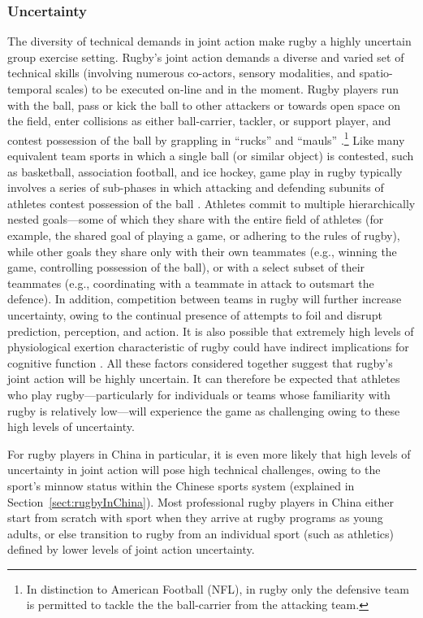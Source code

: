 \begin{CJK}{UTF8}{gbsn}
\subsubsection{Uncertainty}
The diversity of technical demands in joint action make rugby a highly uncertain group exercise setting.  Rugby's joint action demands a diverse and varied set of technical skills (involving numerous co-actors, sensory modalities, and spatio-temporal scales) to be executed on-line and in the moment.  Rugby players run with the ball, pass or kick the ball to other attackers or towards open space on the field, enter collisions as either ball-carrier, tackler, or support player, and contest possession of the ball by grappling in ``rucks'' and ``mauls'' \citep{Ross2015a}.\footnote{In distinction to American Football (NFL), in rugby only the defensive team is permitted to tackle the the ball-carrier from the attacking team.}  Like many equivalent team sports in which a single ball (or similar object) is contested, such as basketball, association football, and ice hockey, game play in rugby typically involves a series of sub-phases in which attacking and defending subunits of athletes contest possession of the ball \citep{Passos2011}.  Athletes commit to multiple hierarchically nested goals---some of which they share with the entire field of athletes (for example, the shared goal of playing a game, or adhering to the rules of rugby), while other goals they share only with their own teammates (e.g., winning the game, controlling possession of the ball), or with a select subset of their teammates (e.g., coordinating with a teammate in attack to outsmart the defence).  In addition, competition between teams in rugby will further increase uncertainty, owing to the continual presence of attempts to foil and disrupt prediction, perception, and action. It is also possible that extremely high levels of physiological exertion characteristic of rugby could have indirect implications for cognitive function \citep{Dietrich2004a}.
All these factors considered together suggest that rugby's joint action will be highly uncertain. It can therefore be expected that athletes who play rugby---particularly for individuals or teams whose familiarity with rugby is relatively low---will experience the game as challenging owing to these high levels of uncertainty. 

For rugby players in China in particular, it is even more likely that high levels of uncertainty in joint action will pose high technical challenges, owing to the sport's minnow status within the Chinese sports system (explained in Section~\ref{sect:rugbyInChina}).  Most professional rugby players in China either start from scratch with sport when they arrive at rugby programs as young adults, or else transition to rugby from an individual sport (such as athletics) defined by lower levels of joint action uncertainty.



\end{CJK}
